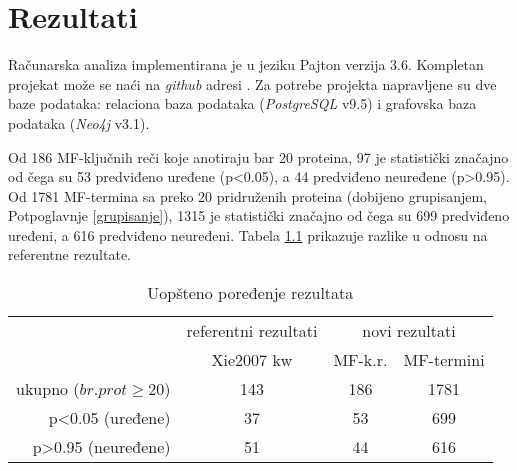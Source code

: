
\chapter{Rezultati} %

\label{Rezultati} %

Računarska analiza implementirana je u jeziku Pajton  verzija 3.6.
Kompletan projekat može se naći na \textit{github} adresi \cite{projekat}. Za
potrebe projekta napravljene su dve baze podataka: relaciona baza podataka
(\textit{PostgreSQL} v9.5) i grafovska baza podataka (\textit{Neo4j} v3.1).

Od 186 MF-ključnih reči koje anotiraju bar 20 proteina, 97 je statistički
značajno od čega su 53 predviđeno uređene (p<0.05), a 44 predviđeno neuređene
(p>0.95).  Od 1781 MF-termina sa preko 20 pridruženih proteina (dobijeno
grupisanjem, Potpoglavnje \ref{grupisanje}), 1315 je statistički značajno od
čega su 699 predviđeno uređeni, a 616 predviđeno neuređeni.  Tabela
\ref{tab:kw_uopsteno} prikazuje razlike u odnosu na referentne rezultate.

\begin{table}[htpb]
\begin{tabular}{|r|c|c|c|}
  \hline
                     & \small referentni rezultati  & \multicolumn{2}{c|}{ novi rezultati} \\
                     & Xie2007 kw & MF-k.r.  & MF-termini                  \\
  \hline
  ukupno ($br. prot\ge20$)     & 143        & 186    & 1781                        \\
  p<0.05 (uređene)   & 37         & 53     & 699                         \\
  p>0.95 (neuređene) & 51         & 44     & 616                         \\
  \hline
\end{tabular}
  \centering
  \caption{Uopšteno poređenje rezultata}
  \label{tab:kw_uopsteno}
\end{table}


